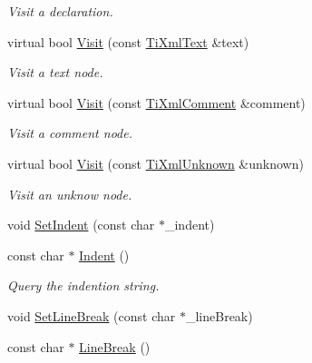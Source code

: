 \begin{DoxyCompactItemize}
\begin{DoxyCompactList}\small\item\em Visit a declaration. \item\end{DoxyCompactList}\item 
\hypertarget{class_ti_xml_printer_a711e7d65d4af9ec70977568d2451fb1c}{
virtual bool \hyperlink{class_ti_xml_printer_a711e7d65d4af9ec70977568d2451fb1c}{Visit} (const \hyperlink{class_ti_xml_text}{TiXmlText} \&text)}
\label{class_ti_xml_printer_a711e7d65d4af9ec70977568d2451fb1c}

\begin{DoxyCompactList}\small\item\em Visit a text node. \item\end{DoxyCompactList}\item 
\hypertarget{class_ti_xml_printer_a83c13d6b980064b30f989f9a35498979}{
virtual bool \hyperlink{class_ti_xml_printer_a83c13d6b980064b30f989f9a35498979}{Visit} (const \hyperlink{class_ti_xml_comment}{TiXmlComment} \&comment)}
\label{class_ti_xml_printer_a83c13d6b980064b30f989f9a35498979}

\begin{DoxyCompactList}\small\item\em Visit a comment node. \item\end{DoxyCompactList}\item 
\hypertarget{class_ti_xml_printer_ad2dca6dd106e8982fd3c7db1f3330970}{
virtual bool \hyperlink{class_ti_xml_printer_ad2dca6dd106e8982fd3c7db1f3330970}{Visit} (const \hyperlink{class_ti_xml_unknown}{TiXmlUnknown} \&unknown)}
\label{class_ti_xml_printer_ad2dca6dd106e8982fd3c7db1f3330970}

\begin{DoxyCompactList}\small\item\em Visit an unknow node. \item\end{DoxyCompactList}\item 
void \hyperlink{class_ti_xml_printer_a213377a4070c7e625bae59716b089e5e}{SetIndent} (const char $\ast$\_\-indent)
\item 
\hypertarget{class_ti_xml_printer_abb33ec7d4bad6aaeb57f4304394b133d}{
const char $\ast$ \hyperlink{class_ti_xml_printer_abb33ec7d4bad6aaeb57f4304394b133d}{Indent} ()}
\label{class_ti_xml_printer_abb33ec7d4bad6aaeb57f4304394b133d}

\begin{DoxyCompactList}\small\item\em Query the indention string. \item\end{DoxyCompactList}\item 
void \hyperlink{class_ti_xml_printer_a4be1e37e69e3858c59635aa947174fe6}{SetLineBreak} (const char $\ast$\_\-lineBreak)
\item 
\hypertarget{class_ti_xml_printer_a11f1b4804a460b175ec244eb5724d96d}{
const char $\ast$ \hyperlink{class_ti_xml_printer_a11f1b4804a460b175ec244eb5724d96d}{LineBreak} ()}
\label{class_ti_xml_printer_a11f1b4804a460b175ec244eb5724d96d}


\end{DoxyCompactItemize}
